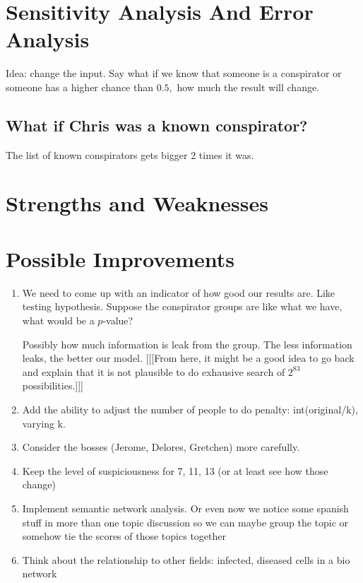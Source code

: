 \documentclass{icmmcm}
\begin{document}

\section{Sensitivity Analysis And Error Analysis}
Idea: change the input. Say what if we know that someone is a conspirator
or someone has a higher chance than $0.5,$
how much the result will change.

\subsection{What if Chris was a known conspirator?}
The list of known conspirators gets bigger 2 times it was. 

\section{Strengths and Weaknesses}

\section{Possible Improvements}
\begin{enumerate}
\item We need to come up with an indicator of how good our results are.
Like testing hypothesis. Suppose the conspirator groups are 
like what we have, what would be a $p$-value?

Possibly how much information is leak from the group.
The less information leaks, the better our model.
 [[[From here, it might be a good idea to go back
and explain that it is not plausible to do exhausive search of
$2^{83}$ possibilities.]]]
\item Add the ability to adjust the number of people to do penalty: int(original/k), varying k.
\item Consider the bosses (Jerome, Delores, Gretchen) more carefully.
\item Keep the level of suspiciousness for 7, 11, 13 (or at least see how those change)
\item Implement semantic network analysis. 
	Or even now we notice some spanish stuff in more than one topic discussion
	so we can maybe group the topic or somehow tie the scores of those topics together
\item Think about the relationship to other fields: infected, diseased cells in a bio network
\end{enumerate}
	
\end{document}
